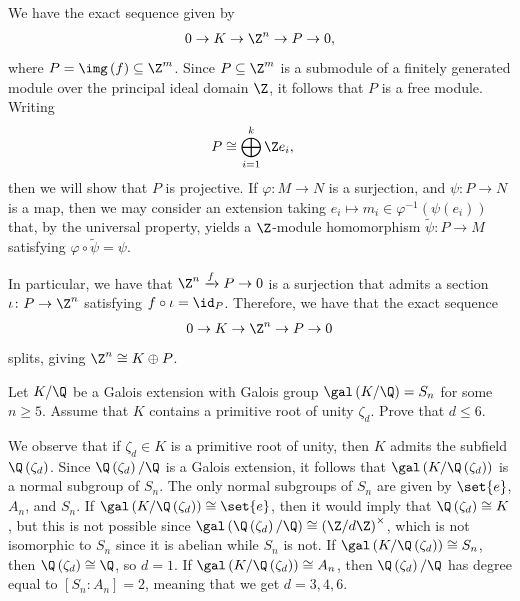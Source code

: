 \documentclass[10pt]{mypackage}
\begin{document}
\begin{solution}
  We have the exact sequence given by
  \begin{align*}
    0 \rightarrow K\rightarrow \Z^{n} \rightarrow P\rightarrow 0,
  \end{align*}
  where $P = \img\left( f \right)\subseteq \Z^{m}$. Since $P\subseteq \Z^{m}$ is a submodule of a finitely generated module over the principal ideal domain $\Z$, it follows that $P$ is a free module. Writing
  \begin{align*}
    P &\cong \bigoplus_{i=1}^{k} \Z e_{i},
  \end{align*}
  then we will show that $P$ is projective. If $\varphi\colon M\rightarrow N$ is a surjection, and $\psi\colon P\rightarrow N$ is a map, then we may consider an extension taking $e_i\mapsto m_i\in \varphi^{-1}\left( \psi\left( e_i \right) \right)$ that, by the universal property, yields a $\Z$-module homomorphism $\widetilde{\psi}\colon P\rightarrow M$ satisfying $\varphi\circ \widetilde{\psi} = \psi$.

  In particular, we have that $\Z^{n}\xrightarrow{f} P\rightarrow 0$ is a surjection that admits a section $\iota\colon P\rightarrow \Z^{n}$ satisfying $f\circ \iota = \id_{P}$. Therefore, we have that the exact sequence
  \begin{align*}
    0 \rightarrow K\rightarrow \Z^{n} \rightarrow P\rightarrow 0
  \end{align*}
  splits, giving $\Z^{n}\cong K\oplus P$.
\end{solution}
\begin{problem}[Problem 6]
  Let $K/\Q$ be a Galois extension with Galois group $\gal\left( K/\Q \right) = S_n$ for some $n\geq 5$. Assume that $K$ contains a primitive root of unity $\zeta_d$. Prove that $d\leq 6$.
\end{problem}
\begin{solution}
  We observe that if $\zeta_d\in K$ is a primitive root of unity, then $K$ admits the subfield $\Q\left( \zeta_d \right)$. Since $\Q\left( \zeta_d \right)/\Q$ is a Galois extension, it follows that $\gal\left( K/\Q\left( \zeta_d \right) \right)$ is a normal subgroup of $S_n$. The only normal subgroups of $S_n$ are given by $\set{e}$, $A_n$, and $S_n$. If $\gal\left( K/\Q\left( \zeta_d \right) \right)\cong \set{e}$, then it would imply that $\Q\left( \zeta_d \right) \cong K$, but this is not possible since $\gal\left( \Q\left( \zeta_d \right)/\Q \right)\cong \left( \Z/d\Z \right)^{\times}$, which is not isomorphic to $S_n$ since it is abelian while $S_n$ is not. If $\gal\left( K/\Q\left( \zeta_d \right) \right)\cong S_n$, then $\Q\left( \zeta_d \right) \cong \Q$, so $d = 1$. If $\gal\left( K/\Q\left( \zeta_d \right) \right)\cong A_n$, then $\Q\left( \zeta_d \right)/\Q$ has degree equal to $\left[ S_n:A_n \right] = 2$, meaning that we get $d = 3,4,6$.
\end{solution}
\end{document}
